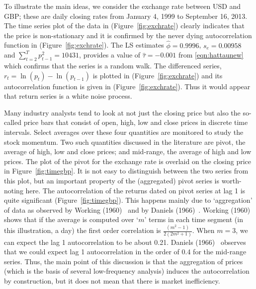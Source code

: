 To illustrate the main ideas, we consider the exchange rate between USD and GBP; these are daily closing rates from January 4, 1999 to September 16, 2013. The time series plot of the data in (Figure~\ref{fig:exchrate}) clearly indicates that the price is non-stationary and it is confirmed by the never dying autocorrelation function in (Figure~\ref{fig:exchrate}). The LS estimates $\hat{\phi}= 0.9996$, $s_e= 0.00958$ and $\sum_{t=2}^T p_{t-1}^2 = 10431$, provides a value of $\hat{\tau} = -0.001$ from \eqref{eqn:hattaunew} which confirms that the series is a random walk. The differenced series, $r_t = \ln{(p_t)} - \ln{(p_{t-1})}$ is plotted in (Figure~\ref{fig:exchrate}) and its autocorrelation function is given in (Figure~\ref{fig:exchrate}). Thus it would appear that return series is a white noise process.


Many industry analysts tend to look at not just the closing price but also the so-called price bars that consist of open, high, low and close prices in discrete time intervals. Select averages over these four quantities are monitored to study the stock momentum. Two such quantities discussed in the literature are pivot, the average of high, low and close prices; and mid-range, the average of high and low prices. The plot of the pivot for the exchange rate is overlaid on the closing price in Figure~\ref{fig:timegbp}. It is not easy to distinguish between the two series from this plot, but an important property of the (aggregated) pivot series is worth-noting here. The autocorrelation of the returns dated on pivot series at lag 1 is quite significant (Figure~\ref{fig:timegbp}). This happens mainly due to `aggregation' of data as observed by Working (1960)~\cite{working1960note} and by Daniels (1966)~\cite{daniels1966autocorrelation}. Working (1960)~\cite{working1960note} shows that if the average is computed over `$m$' terms in each time segment (in this illustration, a day) the first order correlation is $\frac{(m^2-1)}{2(2m^2+1)}$. When $m= 3$, we can expect the lag 1 autocorrelation to be about 0.21. Daniels (1966)~\cite{daniels1966autocorrelation} observes that we could expect lag 1 autocorrelation in the order of 0.4 for the mid-range series. Thus, the main point of this discussion is that the aggregation of prices (which is the basis of several low-frequency analysis) induces the autocorrelation by construction, but it does not mean that there is market inefficiency.
